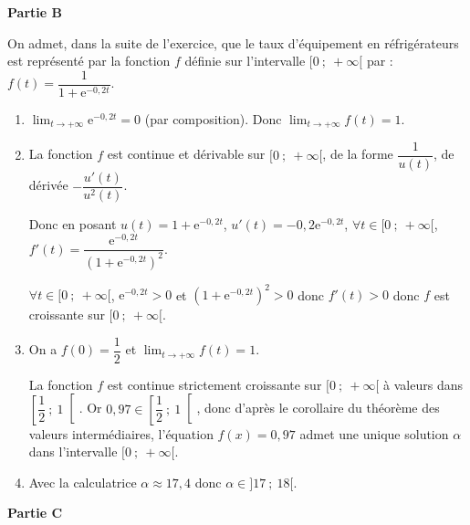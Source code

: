 \documentclass[10pt]{article}
\providecommand{\e}{{\mathrm{e}}}
\begin{document}
\medskip

\textbf{Partie B}

\medskip

On admet, dans la suite de l'exercice, que le taux d'équipement en réfrigérateurs est représenté par la fonction $f$ définie sur l'intervalle $[0~;~+\infty[$ par : $f(t) = \dfrac{1}{1+ \e^{-0,2t}}$.

\begin{enumerate}
	\item $\displaystyle\lim_{t \to + \infty} \e^{-0,2t} = 0$ (par composition). Donc $\displaystyle\lim_{t \to + \infty} f(t)=1$.
	\item La fonction $f$ est continue et dérivable sur $[0~;~+\infty[$, de la forme $\dfrac{1}{u(t)}$, de dérivée $-\dfrac{u'(t)}{u^2(t)}$.

Donc en posant $u(t)=1+ \e^{-0,2t}$, $u'(t)=-0,2\e^{-0,2t}$, $\forall t \in [0~;~+\infty[$, $f'(t)=\dfrac{\e^{-0,2t}}{\left(1+ \e^{-0,2t}\right)^2}$.

$\forall t \in [0~;~+\infty[$, $\e^{-0,2t}>0$ et $\left(1+ \e^{-0,2t}\right)^2>0$ donc $f'(t) > 0$ donc $f$ est croissante sur $[0~;~+\infty[$.
	\item On a $f(0)= \dfrac{1}{2}$ et $\displaystyle\lim_{t \to + \infty} f(t)=1$.

La fonction $f$ est continue strictement croissante sur $[0~;~+\infty[$ à valeurs dans $\left[\dfrac{1}{2}~;~1\right[$. Or $0,97 \in \left[\dfrac{1}{2}~;~1\right[$, donc d'après le corollaire du théorème des valeurs intermédiaires, l'équation $f(x) = 0,97$ admet une unique solution $\alpha$ dans l'intervalle  $[0~;~+\infty[$.
	\item Avec la calculatrice $\alpha \approx 17,4$ donc $\alpha \in ]17~;~18[$.
\end{enumerate}

\medskip

\textbf{Partie C}

\medskip
\end{document}
